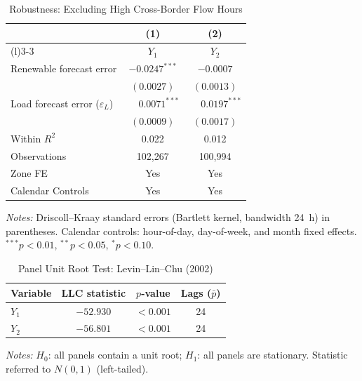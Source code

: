 \begin{table}[htbp]
\centering
\caption{Robustness: Excluding High Cross-Border Flow Hours}
\label{tab:r2_flow}
\begin{threeparttable}
\begin{tabularx}{\linewidth}{>{\raggedright\arraybackslash}Xcc}
\toprule
 & (1) & (2) \\
\cmidrule(r){2-2}\cmidrule(l){3-3}
 & $Y_1$ & $Y_2$ \\
\midrule
Renewable forecast error & $-0.0247^{***}$ & $-0.0007$ \\
 & $(0.0027)$ & $(0.0013)$ \\[0.4ex]
Load forecast error ($\varepsilon_L$) & $\phantom{-}0.0071^{***}$ & $\phantom{-}0.0197^{***}$ \\
 & $(0.0009)$ & $(0.0017)$ \\
\midrule
Within $R^2$ & 0.022 & 0.012 \\
Observations & 102,267 & 100,994 \\
Zone FE & Yes & Yes \\
Calendar Controls & Yes & Yes \\
\bottomrule
\end{tabularx}
\begin{tablenotes}[flushleft]
\footnotesize
\item \textit{Notes:} Driscoll--Kraay standard errors (Bartlett kernel, bandwidth 24~h) in parentheses. Calendar controls: hour-of-day, day-of-week, and month fixed effects. $^{***}p<0.01$, $^{**}p<0.05$, $^{*}p<0.10$.
\end{tablenotes}
\end{threeparttable}
\end{table}

\begin{table}[htbp]
\centering
\caption{Panel Unit Root Test: Levin--Lin--Chu (2002)}
\label{tab:r3_unitroot}
\begin{threeparttable}
\begin{tabularx}{\linewidth}{>{\raggedright\arraybackslash}Xccc}
\toprule
Variable & LLC statistic & $p$-value & Lags ($\bar{p}$) \\
\midrule
$Y_1$ & $-52.930$ & $<0.001$ & 24 \\
$Y_2$ & $-56.801$ & $<0.001$ & 24 \\
\bottomrule
\end{tabularx}
\begin{tablenotes}[flushleft]
\footnotesize
\item \textit{Notes:} $H_0$: all panels contain a unit root; $H_1$: all panels are stationary. Statistic referred to $N(0,1)$ (left-tailed).
\end{tablenotes}
\end{threeparttable}
\end{table}

